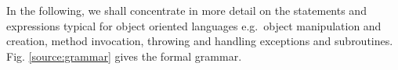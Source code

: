 In the following, we shall concentrate in more detail on the statements and expressions typical for 
object oriented languages e.g.\ object manipulation and creation, method invocation, throwing and handling exceptions and subroutines.
Fig. \ref{source:grammar} gives the formal grammar.
 
\begin{figure}[ht!] 
\end{figure}
